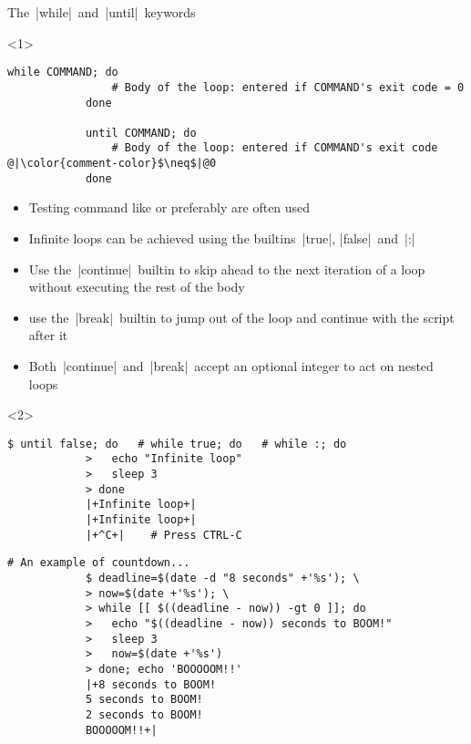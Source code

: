 \begin{frame}[fragile]{The \,\bash|while|\, and \,\bash|until|\, keywords}
    \begin{onlyenv}<1>
        \begin{lstlisting}[style=MyBash, numbers=none]
            while COMMAND; do
                # Body of the loop: entered if COMMAND's exit code = 0
            done

            until COMMAND; do
                # Body of the loop: entered if COMMAND's exit code @|\color{comment-color}$\neq$|@0
            done
        \end{lstlisting}
        \bigskip
        \begin{itemize}
            \item Testing command like \bash{[} or preferably \bash{[[} are often used
            \item Infinite loops can be achieved using the builtins \,\bash|true|, \bash|false|\, and \,\bash|:|
            \item Use the \,\bash|continue|\, builtin to skip ahead to the next iteration of a loop without executing the rest of the body
            \item use the \,\bash|break|\, builtin to jump out of the loop and continue with the script after it
            \item Both \,\bash|continue|\, and \,\bash|break|\, accept an optional integer to act on nested loops
        \end{itemize}
    \end{onlyenv}
    \begin{onlyenv}<2>
        \begin{lstlisting}[style=MyBash]
            $ until false; do   # while true; do   # while :; do
            >   echo "Infinite loop"
            >   sleep 3
            > done
            |+Infinite loop+|
            |+Infinite loop+|
            |+^C+|    # Press CTRL-C
        \end{lstlisting}
        \medskip
        \begin{lstlisting}[style=MyBash]
            # An example of countdown...
            $ deadline=$(date -d "8 seconds" +'%s'); \
            > now=$(date +'%s'); \
            > while [[ $((deadline - now)) -gt 0 ]]; do
            >   echo "$((deadline - now)) seconds to BOOM!"
            >   sleep 3
            >   now=$(date +'%s')
            > done; echo 'BOOOOOM!!'
            |+8 seconds to BOOM!
            5 seconds to BOOM!
            2 seconds to BOOM!
            BOOOOOM!!+|

\end{lstlisting}
\end{onlyenv}
\end{frame}
